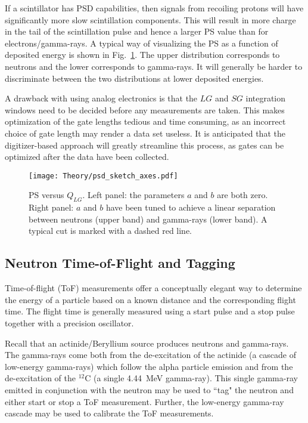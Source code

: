 \documentclass[main.tex]{subfiles}
\begin{document}
If a scintillator has PSD capabilities, then signals from recoiling protons will have significantly more slow scintillation components. This will result in more charge in the tail of the scintillation pulse and hence a larger PS value than for electrons/gamma-rays. A typical way of visualizing the PS as a function of deposited energy is shown in Fig.~\ref{fig:psd_sketch}. The upper distribution corresponds to neutrons and the lower corresponds to gamma-rays. It will generally be harder to discriminate between the two distributions at lower deposited energies.

A drawback with using analog electronics is that the $LG$ and $SG$ integration windows need to be decided before any measurements are taken. This makes optimization of the gate lengths tedious and time consuming, as an incorrect choice of gate length may render a data set useless. It is anticipated that the digitizer-based approach will greatly streamline this process, as gates can be optimized after the data have been collected.
\begin{figure}[ht]
    \centering
        \texttt{[image: Theory/psd\_sketch\_axes.pdf]}
        \caption[PS versus $Q_{LG}$.]{PS versus $Q_{LG}$. Left panel: the parameters $a$ and $b$ are both zero. Right panel: $a$ and $b$ have been tuned to achieve a linear separation between neutrons (upper band) and gamma-rays (lower band). A typical cut is marked with a dashed red line.}
    \label{fig:psd_sketch} 
\end{figure}


\subsection{Neutron Time-of-Flight and Tagging}\label{sec:tof}
Time-of-flight (ToF) measurements offer a conceptually elegant way to determine the energy of a particle based on a known distance and the corresponding flight time. The flight time is generally measured using a start pulse and a stop pulse together with a precision oscillator.

Recall that an actinide/Beryllium source produces neutrons and gamma-rays. The gamma-rays come both from the de-excitation of the actinide (a cascade of low-energy gamma-rays) which follow the alpha particle emission and from the de-excitation of the $^\textrm{12}$C (a single \SI{4.44}{\MeV} gamma-ray). This single gamma-ray emitted in conjunction with the neutron may be used to ``tag" the neutron and either start or stop a ToF measurement. Further, the low-energy gamma-ray cascade may be used to calibrate the ToF measurements.
\end{document}
